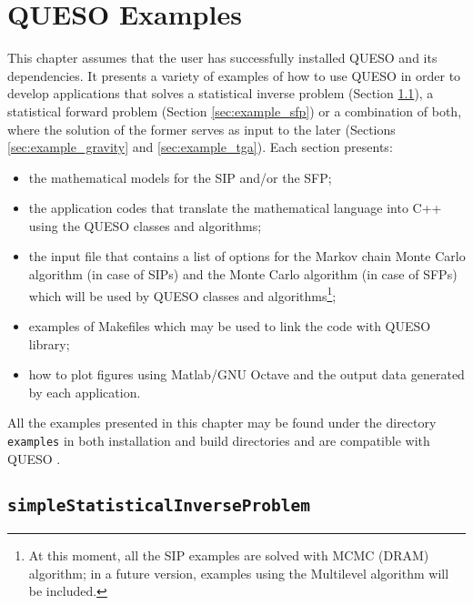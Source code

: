 

\chapter{QUESO Examples}\label{chap:Queso-examples}

This chapter assumes that the user has successfully installed QUESO and its dependencies.
%
It presents a variety of  examples of how to use QUESO in order to develop applications that solves a statistical inverse problem (Section \ref{sec:example_sip}), a statistical forward problem (Section \ref{sec:example_sfp}) or a combination of both, where the solution of the former serves as input to the later (Sections \ref{sec:example_gravity} and \ref{sec:example_tga}). 
Each section presents: 
\begin{itemize}
 \item the mathematical models for the SIP and/or the SFP; \vspace*{-6pt}
 \item the application codes  that translate the mathematical language into C++ using the QUESO classes and algorithms;\vspace*{-6pt}
 \item  the input file that contains a list of options for the Markov chain Monte Carlo algorithm (in case of SIPs) and the Monte Carlo algorithm (in case of SFPs) which will be used by QUESO classes and algorithms\footnote{At this moment, all the SIP examples are solved with MCMC (DRAM) algorithm; in a future version, examples using the Multilevel algorithm will be included.};\vspace*{-6pt}
 \item examples of Makefiles which may be used to link the code  with QUESO library;\vspace*{-6pt}
 \item how to plot figures using Matlab/GNU Octave  and the output data generated by each application. 
\end{itemize}


All the examples presented in this chapter may be found under the directory \texttt{examples} in both \Queso{} installation and build directories and are compatible with QUESO \QUESOversion{}. 


\section{\texttt{simpleStatisticalInverseProblem}}\label{sec:example_sip}

